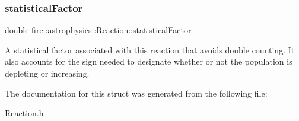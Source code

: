 \subsubsection{\texorpdfstring{statistical\+Factor}{statisticalFactor}}
{\footnotesize\ttfamily double fire\+::astrophysics\+::\+Reaction\+::statistical\+Factor}

A statistical factor associated with this reaction that avoids double counting. It also accounts for the sign needed to designate whether or not the population is depleting or increasing. 

The documentation for this struct was generated from the following file\+:\begin{DoxyCompactItemize}
\item 
Reaction.\+h\end{DoxyCompactItemize}
